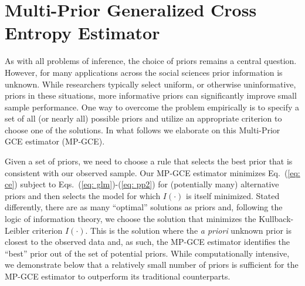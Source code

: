 \documentclass{elsarticle}
\begin{document}

\section{Multi-Prior Generalized Cross Entropy Estimator}
\label{sec: mp-gce}

As with all problems of inference, the choice of priors remains a central question. 
However, for many applications across the social sciences prior information is unknown. 
While researchers typically select uniform, or otherwise uninformative, priors in these 
situations, more informative priors can significantly improve small sample performance. 
One way to overcome the problem empirically is to specify a set of all (or nearly all) possible 
priors and utilize an appropriate criterion to choose one of the solutions. 
In what follows we elaborate on this Multi-Prior GCE estimator (MP-GCE).

Given a set of priors, we need to choose a rule that selects the best prior that is 
consistent with our observed sample. 
Our MP-GCE estimator minimizes Eq.\ (\ref{eq: ce}) subject to 
Eqs.\ (\ref{eq: glm})-(\ref{eq: pp2}) for (potentially many) alternative priors and then selects 
the model for which $I(\cdot)$ is itself minimized. 
Stated differently, there are as many ``optimal'' solutions as priors and, following the logic of 
information theory, we choose the solution that minimizes the Kullback-Leibler criterion 
$I(\cdot)$. 
This is the solution where the \emph{a priori} unknown prior is closest to the observed 
data and, as such, the MP-GCE estimator identifies the ``best'' prior out of the set of 
potential priors. 
While computationally intensive, we demonstrate below that a relatively small number of 
priors is sufficient for the MP-GCE estimator to outperform its traditional counterparts. 
\end{document}
